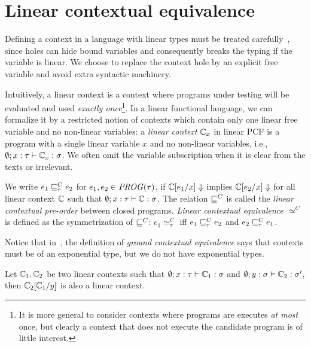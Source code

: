 \documentclass[10pt,a4]{article}
\begin{document}
\section{Linear contextual equivalence}

Defining a context in a language with linear types must be treated carefully~\cite{Bierman}, 
since holes can hide bound variables and consequently breaks the typing if the variable is linear.
We choose to replace the context hole by an explicit free variable and avoid extra syntactic 
machinery.

Intuitively, a linear context is a context where programs under testing will be evaluated and 
used {\em exactly once}\footnote{It is more general to consider contexts where programs are 
executes {\em at most} once, but clearly a context that does not execute the candidate program 
is of little interest.}.
In a linear functional language, we can formalize it by a restricted 
notion of contexts which contain only one linear free variable and no non-linear variables:
a {\em linear context} $\mathbb{C}_x$ in linear PCF is a program with a single linear variable $x$
and no non-linear variables, i.e., 
$\emptyset; x : \tau \vdash \mathbb{C}_x : \sigma$.
We often omit the variable subscription when it is clear from the texts or irrelevant.

\begin{definition}
We write $e_1 \sqsubseteq^C_\tau e_2$ for $e_1, e_2 \in \mathit{PROG}(\tau)$, if 
$\mathbb{C}[e_1 / x] \Downarrow$ implies $\mathbb{C}[e_2 / x] \Downarrow$ for all linear context $\mathbb{C}$ 
such that $\emptyset; x : \tau \vdash \mathbb{C} : \sigma$.
The relation $\sqsubseteq^C$ is called the {\em linear contextual pre-order} between closed programs. 
{\em Linear contextual equivalence $\simeq^C$} is defined as the symmetrization of $\sqsubseteq^C$:
$e_1 \simeq^C_\tau$ iff $e_1 \sqsubseteq^C_\tau e_2$ and $e_2 \sqsubseteq^C_\tau e_1$.
\end{definition}

Notice that in~\cite{BPR}, the definition of {\em ground contextual equivalence} says that 
contexts must be of an exponential type, but we do not have exponential types. 

\begin{lemma}
Let $\mathbb{C}_1, \mathbb{C}_2$ be two linear contexts such that 
$\emptyset; x: \tau \vdash \mathbb{C}_1 : \sigma$ and $ \emptyset; y : \sigma \vdash \mathbb{C}_2 : \sigma'$, 
then $\mathbb{C}_2[\mathbb{C}_1 / y]$ is also a linear context.
\end{lemma}
\end{document}
